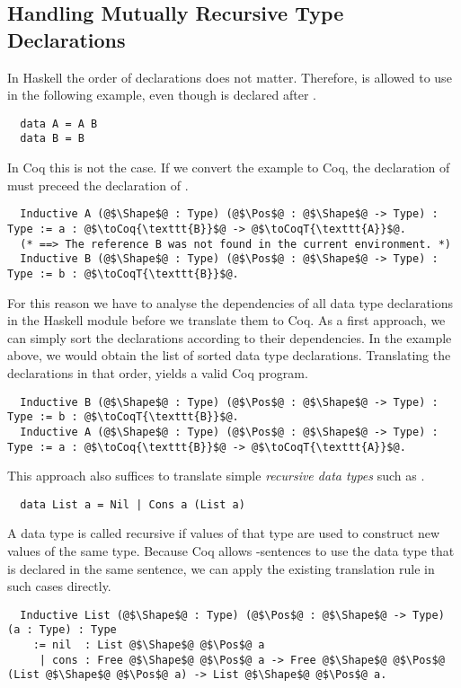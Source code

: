 \subsection{Handling Mutually Recursive Type Declarations}
In Haskell the order of declarations does not matter.
Therefore,  is allowed to use  in the following example, even though  is declared after .
\begin{verbatim}
  data A = A B
  data B = B
\end{verbatim}
In Coq this is not the case.
If we convert the example to Coq, the declaration of  must preceed the declaration of .
\begin{verbatim}
  Inductive A (@$\Shape$@ : Type) (@$\Pos$@ : @$\Shape$@ -> Type) : Type := a : @$\toCoq{\texttt{B}}$@ -> @$\toCoqT{\texttt{A}}$@.
  (* ==> The reference B was not found in the current environment. *)
  Inductive B (@$\Shape$@ : Type) (@$\Pos$@ : @$\Shape$@ -> Type) : Type := b : @$\toCoqT{\texttt{B}}$@.
\end{verbatim}
For this reason we have to analyse the dependencies of all data type declarations in the Haskell module before we translate them to Coq.
As a first approach, we can simply sort the declarations according to their dependencies.
In the example above, we would obtain the list \haskell{[B, A]} of sorted data type declarations.
Translating the declarations in that order, yields a valid Coq program.
\begin{verbatim}
  Inductive B (@$\Shape$@ : Type) (@$\Pos$@ : @$\Shape$@ -> Type) : Type := b : @$\toCoqT{\texttt{B}}$@.
  Inductive A (@$\Shape$@ : Type) (@$\Pos$@ : @$\Shape$@ -> Type) : Type := a : @$\toCoq{\texttt{B}}$@ -> @$\toCoqT{\texttt{A}}$@.
\end{verbatim}

This approach also suffices to translate simple \textit{recursive data types} such as .
\begin{verbatim}
  data List a = Nil | Cons a (List a)
\end{verbatim}
A data type is called recursive if values of that type are used to construct new values of the same type.
Because Coq allows -sentences to use the data type that is declared in the same sentence, we can apply the existing translation rule in such cases directly.
\begin{verbatim}
  Inductive List (@$\Shape$@ : Type) (@$\Pos$@ : @$\Shape$@ -> Type) (a : Type) : Type
    := nil  : List @$\Shape$@ @$\Pos$@ a
     | cons : Free @$\Shape$@ @$\Pos$@ a -> Free @$\Shape$@ @$\Pos$@ (List @$\Shape$@ @$\Pos$@ a) -> List @$\Shape$@ @$\Pos$@ a.
\end{verbatim}

